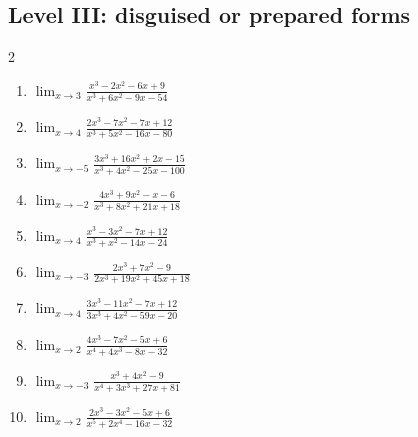 \documentclass[11pt,oneside]{book}
\begin{document}
\subsection*{Level III: disguised or prepared forms}
\begin{multicols}{2}
\begin{enumerate}[leftmargin=*,label=\textbf{\arabic*.},itemsep=0.65\baselineskip]
\item $\displaystyle \lim_{x \to 3} \frac{x^{3} - 2 x^{2} - 6 x + 9}{x^{3} + 6 x^{2} - 9 x - 54}$
\item $\displaystyle \lim_{x \to 4} \frac{2 x^{3} - 7 x^{2} - 7 x + 12}{x^{3} + 5 x^{2} - 16 x - 80}$
\item $\displaystyle \lim_{x \to -5} \frac{3 x^{3} + 16 x^{2} + 2 x - 15}{x^{3} + 4 x^{2} - 25 x - 100}$
\item $\displaystyle \lim_{x \to -2} \frac{4 x^{3} + 9 x^{2} - x - 6}{x^{3} + 8 x^{2} + 21 x + 18}$
\item $\displaystyle \lim_{x \to 4} \frac{x^{3} - 3 x^{2} - 7 x + 12}{x^{3} + x^{2} - 14 x - 24}$
\item $\displaystyle \lim_{x \to -3} \frac{2 x^{3} + 7 x^{2} - 9}{2 x^{3} + 19 x^{2} + 45 x + 18}$
\item $\displaystyle \lim_{x \to 4} \frac{3 x^{3} - 11 x^{2} - 7 x + 12}{3 x^{3} + 4 x^{2} - 59 x - 20}$
\item $\displaystyle \lim_{x \to 2} \frac{4 x^{3} - 7 x^{2} - 5 x + 6}{x^{4} + 4 x^{3} - 8 x - 32}$
\item $\displaystyle \lim_{x \to -3} \frac{x^{3} + 4 x^{2} - 9}{x^{4} + 3 x^{3} + 27 x + 81}$
\item $\displaystyle \lim_{x \to 2} \frac{2 x^{3} - 3 x^{2} - 5 x + 6}{x^{5} + 2 x^{4} - 16 x - 32}$
\end{enumerate}
\end{multicols}
\end{document}
